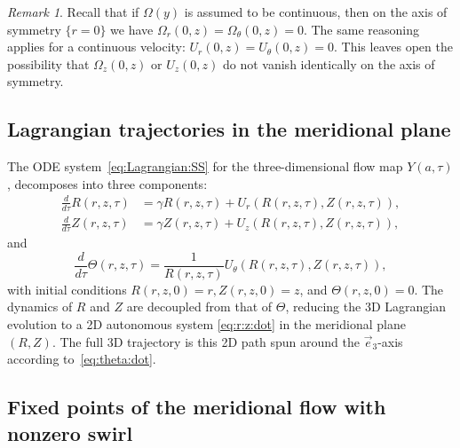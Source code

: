 \documentclass[11pt,reqno]{amsproc}
\numberwithin{equation}{section}
\theoremstyle{remark}
\newtheorem{remark}[theorem]{Remark}
\begin{document}
\begin{remark}
\label{rem:vanishing:on:axis}
Recall that if $\Omega(y)$ is assumed to be continuous, then on the axis of symmetry $\{r=0\}$ we have $\Omega_r (0,z) = \Omega_\theta(0,z) = 0$. The same reasoning applies for a continuous velocity: $U_r(0,z) = U_\theta(0,z) = 0$.  This leaves open the possibility that $\Omega_z(0,z)$ or   $U_z(0,z)$ do not vanish identically on the axis of symmetry.  
\end{remark}


\subsection{Lagrangian trajectories in the meridional  plane}
The ODE system~\eqref{eq:Lagrangian:SS} for the three-dimensional flow map $Y(a,\tau)$,  decomposes into three components:
\begin{equation}
\label{eq:r:z:dot}
\begin{aligned}
\frac{d}{d\tau} R(r,z,\tau) &= \gamma R(r,z,\tau)  + U_r(R(r,z,\tau),Z(r,z,\tau) ),  \\
\frac{d}{d\tau} Z(r,z,\tau) &= \gamma Z(r,z,\tau) + U_z(R(r,z,\tau), Z(r,z,\tau)), 
\end{aligned}
\end{equation}
and 
\begin{equation}
 \frac{d}{d\tau} \Theta(r,z,\tau) = \frac{1}{R(r,z,\tau)}  U_\theta(R(r,z,\tau), Z(r,z,\tau)),  
 \label{eq:theta:dot}
\end{equation}
with initial conditions $R(r,z,0) = r , Z(r,z,0) = z$, and $\Theta(r,z,0) = 0$. The dynamics of $R$ and $Z$ are decoupled from that of $\Theta$, reducing the 3D Lagrangian evolution to a 2D autonomous system \eqref{eq:r:z:dot}  in the meridional plane $(R, Z)$. The full 3D trajectory is this 2D path spun around the $\vec{e}_3$-axis according to~\eqref{eq:theta:dot}. 

\subsection{Fixed points of the meridional flow with nonzero swirl}
\label{sec:axi:Kelvin}
\end{document}
